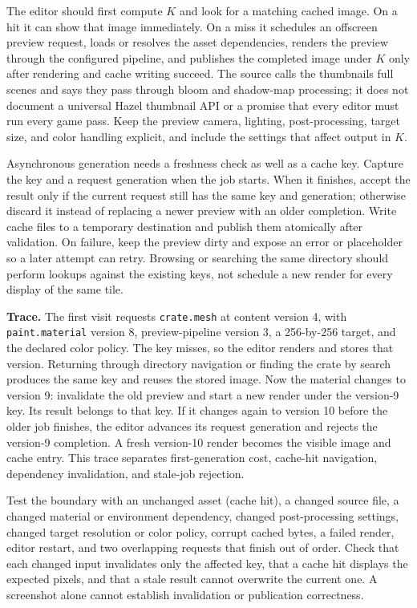 The editor should first compute \(K\) and look for a matching cached image. On a hit it can show that image immediately. On a miss it schedules an offscreen preview request, loads or resolves the asset dependencies, renders the preview through the configured pipeline, and publishes the completed image under \(K\) only after rendering and cache writing succeed. The source calls the thumbnails full scenes and says they pass through bloom and shadow-map processing; it does not document a universal Hazel thumbnail API or a promise that every editor must run every game pass. Keep the preview camera, lighting, post-processing, target size, and color handling explicit, and include the settings that affect output in \(K\).

Asynchronous generation needs a freshness check as well as a cache key. Capture the key and a request generation when the job starts. When it finishes, accept the result only if the current request still has the same key and generation; otherwise discard it instead of replacing a newer preview with an older completion. Write cache files to a temporary destination and publish them atomically after validation. On failure, keep the preview dirty and expose an error or placeholder so a later attempt can retry. Browsing or searching the same directory should perform lookups against the existing keys, not schedule a new render for every display of the same tile.

\textbf{Trace.} The first visit requests \texttt{crate.mesh} at content version 4, with \texttt{paint.material} version 8, preview-pipeline version 3, a 256-by-256 target, and the declared color policy. The key misses, so the editor renders and stores that version. Returning through directory navigation or finding the crate by search produces the same key and reuses the stored image. Now the material changes to version 9: invalidate the old preview and start a new render under the version-9 key. Its result belongs to that key. If it changes again to version 10 before the older job finishes, the editor advances its request generation and rejects the version-9 completion. A fresh version-10 render becomes the visible image and cache entry. This trace separates first-generation cost, cache-hit navigation, dependency invalidation, and stale-job rejection.

Test the boundary with an unchanged asset (cache hit), a changed source file, a changed material or environment dependency, changed post-processing settings, changed target resolution or color policy, corrupt cached bytes, a failed render, editor restart, and two overlapping requests that finish out of order. Check that each changed input invalidates only the affected key, that a cache hit displays the expected pixels, and that a stale result cannot overwrite the current one. A screenshot alone cannot establish invalidation or publication correctness.


